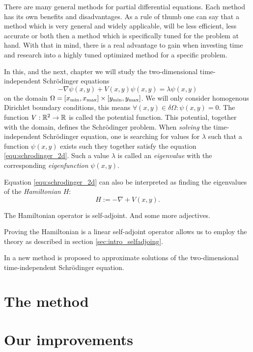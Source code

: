 



There are many general methods for partial differential equations. Each method has its own benefits and disadvantages. As a rule of thumb one can say that a method which is very general and widely applicable, will be less efficient, less accurate or both then a method which is specifically tuned for the problem at hand. With that in mind, there is a real advantage to gain when investing time and research into a highly tuned optimized method for a specific problem.

In this, and the next, chapter we will study the two-dimensional time-independent Schrödinger equations
\begin{equation}\label{equ:schrodinger_2d}
    -\nabla\psi(x, y) + V(x, y) \psi(x, y) = \lambda \psi(x, y)
\end{equation}
on the domain $\Omega = [x_\text{min}, x_\text{max}]\times[y_\text{min}, y_\text{max}]$. We will only consider homogenous Dirichlet boundary conditions, this means $\forall (x, y) \in \delta\Omega : \psi(x, y) = 0$. The function $V: \mathbb{R}^2 \to \mathbb{R}$ is called the potential function. This potential, together with the domain, defines the Schrödinger problem. When \emph{solving} the time-independent Schrödinger equation, one is searching for values for $\lambda$ such that a function $\psi(x, y)$  exists such they together satisfy the equation \eqref{equ:schrodinger_2d}. Such a value $\lambda$ is called an \emph{eigenvalue} with the corresponding \emph{eigenfunction} $\psi(x, y)$.

Equation \eqref{equ:schrodinger_2d} can also be interpreted as finding the eigenvalues of the \emph{Hamiltonian} $H$:
$$
    H := -\nabla + V(x, y)\text{.}
$$
\begin{theorem}
    The Hamiltonian operator is self-adjoint. And some more adjectives.
\end{theorem}

Proving the Hamiltonian is a linear self-adjoint operator allows us to employ the theory as described in section \ref{sec:intro_selfadjoing}.

In \cite{ixaru_new_2010} a new method is proposed to approximate solutions of the two-dimensional time-independent Schrödinger equation.

\section{The method}

\section{Our improvements}

\subsection{}

\stopchapter
